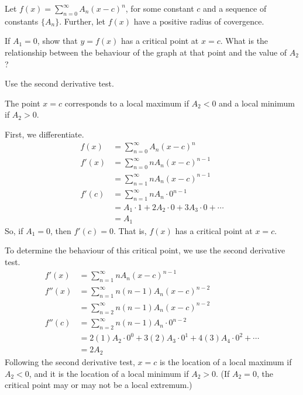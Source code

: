 \begin{question}
	Let $f(x)=\displaystyle\sum_{n=0}^{\infty}A_n(x-c)^n$, for some constant $c$ and a sequence of constants $\{A_n\}$. Further, let $f(x)$ have a positive radius of covergence.

	If $A_1=0$, show that $y=f(x)$ has a critical point at $x=c$. What is the relationship between the behaviour of the graph at that point and the value of $A_2$?
\end{question}
\begin{hint}
	Use the second derivative test.
\end{hint}
\begin{answer}
	The point $x=c$ corresponds to a local maximum if $A_2<0$ and a local minimum if $A_2>0$.
\end{answer}
\begin{solution}
	First, we differentiate.
	\begin{align*}
	f(x)&=\displaystyle\sum_{n=0}^{\infty}A_n(x-c)^n\\
	f'(x)&=\sum_{n=0}^{\infty}nA_n(x-c)^{n-1}\\
	&=\sum_{n=1}^{\infty}nA_n(x-c)^{n-1}\\
	f'(c)&=\sum_{n=1}^\infty nA_n\cdot 0^{n-1}\\
	&=A_1\cdot 1 + 2A_2\cdot0+3A_3\cdot0+\cdots\\
	&=A_1
	\end{align*}
	So, if $A_1=0$, then $f'(c)=0$. That is, $f(x)$ has a critical point at $x=c$.

	To determine the behaviour of this critical point, we use the second derivative test.
	\begin{align*}
	f'(x)&=\sum_{n=1}^{\infty}nA_n(x-c)^{n-1}\\
	f''(x)&=\sum_{n=1}^{\infty}n(n-1)A_n(x-c)^{n-2}\\
	&=\sum_{n=2}^{\infty}n(n-1)A_n(x-c)^{n-2}\\
	f''(c)&=\sum_{n=2}^{\infty}n(n-1)A_n\cdot 0^{n-2}\\
	&=2(1)A_2\cdot 0^0+3(2)A_3\cdot 0^1+4(3)A_4\cdot 0^2+\cdots\\
	&=2A_2
	\end{align*}
	Following the second derivative test, $x=c$	is the location of a local maximum if $A_2<0$, and it is the location of a local minimum if $A_2>0$. (If $A_2=0$, the critical point may or may not  be a local extremum.)
\end{solution}


